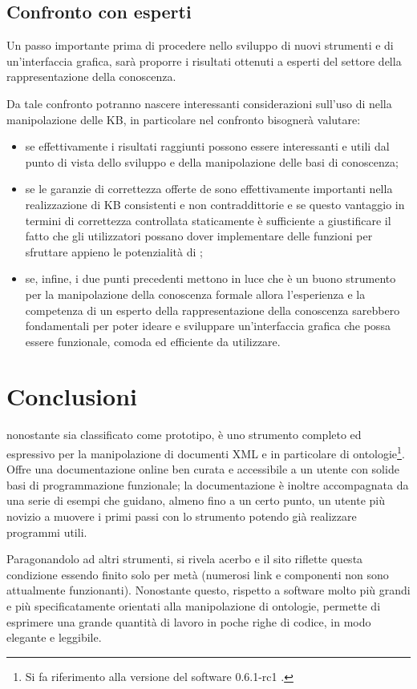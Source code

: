 \subsection{Confronto con esperti}
Un passo importante prima di procedere nello sviluppo di nuovi strumenti e di un'interfaccia grafica, sarà proporre i risultati ottenuti a esperti del settore della rappresentazione della conoscenza.

Da tale confronto potranno nascere interessanti considerazioni sull'uso di \cduce nella manipolazione delle KB, in particolare nel confronto bisognerà valutare:
\begin{itemize}
	\item se effettivamente i risultati raggiunti possono essere interessanti e utili dal punto di vista dello sviluppo e della manipolazione delle basi di conoscenza;
	\item se le garanzie di correttezza offerte de \cduce sono effettivamente importanti nella realizzazione di KB consistenti e non contraddittorie e se questo vantaggio in termini di correttezza controllata staticamente è sufficiente a giustificare il fatto che gli utilizzatori possano dover implementare delle funzioni per sfruttare appieno le potenzialità di \cduce;
	\item se, infine, i due punti precedenti mettono in luce che \cduce è un buono strumento per la manipolazione della conoscenza formale allora l'esperienza e la competenza di un esperto della rappresentazione della conoscenza sarebbero fondamentali per poter ideare e sviluppare un'interfaccia grafica che possa essere funzionale, comoda ed efficiente da utilizzare.
\end{itemize}
\section{Conclusioni}
\cduce nonostante sia classificato come prototipo, è uno strumento completo ed espressivo per la manipolazione di documenti XML e in particolare di ontologie\footnote{Si fa riferimento alla versione del software 0.6.1-rc1 .}. Offre una documentazione online ben curata e accessibile a un utente con solide basi di programmazione funzionale; la documentazione è inoltre accompagnata da una serie di esempi che guidano, almeno fino a un certo punto, un utente più novizio a muovere i primi passi con lo strumento potendo già realizzare programmi utili.

Paragonandolo ad altri strumenti, si rivela acerbo e il sito riflette questa condizione essendo finito solo per metà (numerosi link e componenti non sono attualmente funzionanti). Nonostante questo, rispetto a software molto più grandi e più specificatamente orientati alla manipolazione di ontologie, \cduce permette di esprimere una grande quantità di lavoro in poche righe di codice, in modo elegante e leggibile. 

